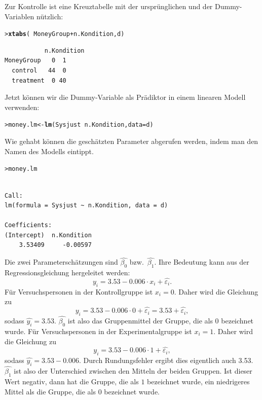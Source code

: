 \documentclass[oneside, 10pt]{book}\usepackage[]{graphicx}\usepackage[]{xcolor}
\makeatletter
\newcommand{\hlopt}[1]{\textcolor[rgb]{0,0,0}{#1}}%
\newcommand{\hlstd}[1]{\textcolor[rgb]{0.345,0.345,0.345}{#1}}%
\newcommand{\hlkwb}[1]{\textcolor[rgb]{0.69,0.353,0.396}{#1}}%
\newcommand{\hlkwc}[1]{\textcolor[rgb]{0.333,0.667,0.333}{#1}}%
\newcommand{\hlkwd}[1]{\textcolor[rgb]{0.737,0.353,0.396}{\textbf{#1}}}%
\newenvironment{kframe}{%
 \def\at@end@of@kframe{}%
 \ifinner\ifhmode%
  \def\at@end@of@kframe{\end{minipage}}%
  \begin{minipage}{\columnwidth}%
 \fi\fi%
 \def\FrameCommand##1{\hskip\@totalleftmargin \hskip-\fboxsep
 \colorbox{shadecolor}{##1}\hskip-\fboxsep
     \hskip-\linewidth \hskip-\@totalleftmargin \hskip\columnwidth}%
 \MakeFramed {\advance\hsize-\width
   \@totalleftmargin\z@ \linewidth\hsize
   \@setminipage}}%
 {\par\unskip\endMakeFramed%
 \at@end@of@kframe}
\newenvironment{knitrout}{}{} %
\makeatother
\begin{document}
Zur Kontrolle ist eine Kreuztabelle mit der ursprünglichen und der Dummy-Variablen
nützlich:
\begin{knitrout}
\color{fgcolor}\begin{kframe}
\begin{alltt}
\hlstd{> }\hlkwd{xtabs}\hlstd{(}\hlopt{~} \hlstd{MoneyGroup} \hlopt{+} \hlstd{n.Kondition, d)}
\end{alltt}
\begin{verbatim}
           n.Kondition
MoneyGroup   0  1
  control   44  0
  treatment  0 40
\end{verbatim}
\end{kframe}
\end{knitrout}

Jetzt können wir die Dummy-Variable als Prädiktor in
einem linearen Modell verwenden:
\begin{knitrout}
\color{fgcolor}\begin{kframe}
\begin{alltt}
\hlstd{> }\hlstd{money.lm} \hlkwb{<-} \hlkwd{lm}\hlstd{(Sysjust} \hlopt{~} \hlstd{n.Kondition,} \hlkwc{data} \hlstd{= d)}
\end{alltt}
\end{kframe}
\end{knitrout}
Wie gehabt können die geschätzten Parameter abgerufen
werden, indem man den Namen des Modells eintippt.
\begin{knitrout}
\color{fgcolor}\begin{kframe}
\begin{alltt}
\hlstd{> }\hlstd{money.lm}
\end{alltt}
\begin{verbatim}

Call:
lm(formula = Sysjust ~ n.Kondition, data = d)

Coefficients:
(Intercept)  n.Kondition  
    3.53409     -0.00597  
\end{verbatim}
\end{kframe}
\end{knitrout}
Die zwei Parameterschätzungen sind $\widehat{\beta_0}$ bzw.\
$\widehat{\beta_1}$. Ihre Bedeutung kann aus der Regressionsgleichung hergeleitet werden:
\[
 y_i = 3.53 - 0.006 \cdot x_i + \widehat{\varepsilon_i}.
\]
Für Versuchspersonen in der Kontrollgruppe ist $x_i = 0$.
Daher wird die Gleichung zu
\[
  y_i = 3.53 - 0.006 \cdot 0 + \widehat{\varepsilon_i} = 3.53 + \widehat{\varepsilon_i},
\]
sodass $\widehat{y_i} = 3.53$.
$\widehat{\beta_0}$ ist also das Gruppenmittel der Gruppe, die als $0$ bezeichnet wurde.
Für Versuchspersonen in der Experimentalgruppe ist $x_i = 1$.
Daher wird die Gleichung zu
\[
  y_i = 3.53 - 0.006 \cdot 1 + \widehat{\varepsilon_i},
\]
sodass $\widehat{y_i} = 3.53 - 0.006$. Durch Rundungsfehler ergibt dies eigentlich auch 3.53. $\widehat{\beta_1}$ ist also der Unterschied zwischen den Mitteln der beiden Gruppen. Ist dieser Wert negativ, dann hat die Gruppe, die als $1$ bezeichnet wurde, ein niedrigeres Mittel als die Gruppe, die als $0$ bezeichnet wurde.
\end{document}
